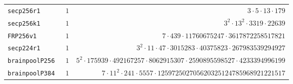 \documentclass[11pt,fleqn]{article}
\begin{document}
\begin{tabularx}{\textwidth}{llR}
\texttt{\footnotesize secp256r1     }& $\scriptstyle 1  $    & $\scriptstyle 3 \cdot 5 \cdot 13 \cdot 179                                                             $\\
\texttt{\footnotesize secp256k1     }& $\scriptstyle 1  $    & $\scriptstyle 3^2 \cdot 13^2 \cdot 3319 \cdot 22639                                                    $\\
\texttt{\footnotesize FRP256v1      }& $\scriptstyle 1  $    & $\scriptstyle 7 \cdot 439 \cdot 11760675247 \cdot 3617872258517821                                     $\\
\texttt{\footnotesize secp224r1     }& $\scriptstyle 1  $    & $\scriptstyle 3^2 \cdot 11 \cdot 47 \cdot 3015283 \cdot 40375823 \cdot 267983539294927                 $\\
\texttt{\footnotesize brainpoolP256 }& $\scriptstyle 1  $    & $\scriptstyle 5^2 \cdot 175939 \cdot 492167257 \cdot 8062915307 \cdot 2590895598527 \cdot 4233394996199$\\
\texttt{\footnotesize brainpoolP384 }& $\scriptstyle 1  $    & $\scriptstyle 7 \cdot 11^2 \cdot 241 \cdot 5557 \cdot 125972502705620325124785968921221517             $\\
\hline
\end{tabularx}

\printbibliography
\end{document}
